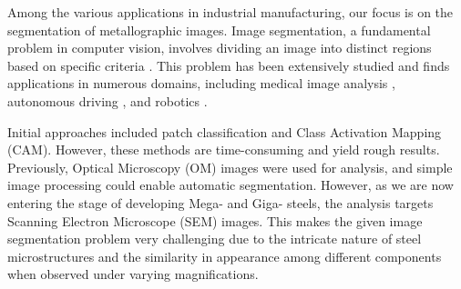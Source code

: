 \documentclass[]{article}
\begin{document}
Among the various applications in industrial manufacturing, our focus is on the segmentation of metallographic images. Image segmentation, a fundamental problem in computer vision, involves dividing an image into distinct regions based on specific criteria \cite{HARALICK1985100}. This problem has been extensively studied and finds applications in numerous domains, including medical image analysis \cite{Litjens_2017, shen2017}, autonomous driving \cite{chen2017deeplab}, and robotics \cite{garciagarcia2017review}.

Initial approaches included patch classification and Class Activation Mapping (CAM). However, these methods are time-consuming and yield rough results. Previously, Optical Microscopy (OM) images were used for analysis, and simple image processing could enable automatic segmentation. However, as we are now entering the stage of developing Mega- and Giga- steels, the analysis targets Scanning Electron Microscope (SEM) images. This makes the given image segmentation problem very challenging due to the intricate nature of steel microstructures and the similarity in appearance among different components when observed under varying magnifications.
\end{document}
